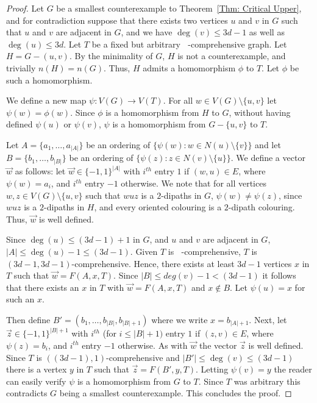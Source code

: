 \documentclass[11pt]{article}
\theoremstyle{definition}
\DeclareMathOperator{\coe}{6\Big(1+\frac{9d^2}{4}\Big)^{\frac{1}{2}}d}
\DeclareMathOperator{\bound}{\Big( 3d-1, \coe\sqrt{n}\Big)}
\begin{document}
\begin{proof}
    Let $G$ be a smallest counterexample to Theorem~\ref{Thm: Critical Upper},
    and for contradiction suppose that there exists two vertices $u$ and $v$ in $G$ such that
    $u$ and $v$ are adjacent in $G$, and we have $\deg(v)\leq 3d-1$ as well as $\deg(u)\leq 3d$.
    Let $T$ be a fixed but arbitrary $\bound$-comprehensive graph.
    Let $H = G - (u,v)$.
    By the minimality of $G$, $H$ is not a counterexample,
    and trivially $n(H) = n(G)$.
    Thus, $H$ admits a homomorphism $\phi$ to $T$.
    Let $\phi$ be such a homomorphism.

    We define a new map $\psi: V(G) \rightarrow V(T)$.
    For all $w \in V(G)\setminus \{u,v\}$ let $\psi(w)=\phi(w)$.
    Since $\phi$ is a homomorphism from $H$ to $G$, 
    without having defined $\psi(u)$ or $\psi(v)$,
    $\psi$ is a homomorphism from $G-\{u,v\}$ to $T$.

    Let $A = \{a_1,\dots, a_{|A|}\}$ be an ordering of $\{\psi(w): w \in N(u)\setminus \{v\}\}$ and let $B = \{b_1,\dots, b_{|B|}\}$ be an ordering of $\{\psi(z): z \in N(v)\setminus \{u\}\}$.
    We define a vector $\vec{w}$ as follows: let $\vec{w} \in \{-1,1\}^{|A|}$ with $i^{th}$ entry $1$ if $(w,u)\in E$, where $\psi(w) = a_i$, and $i^{th}$ entry $-1$ otherwise.
    We note that for all vertices $w,z \in V(G)\setminus \{u,v\}$ such that 
    $wuz$ is a $2$-dipaths in $G$, $\psi(w)\neq \psi(z)$,
    since $wuz$ is a $2$-dipaths in $H$, and every oriented colouring is a $2$-dipath colouring.
    Thus, $\vec{w}$ is well defined.

    Since $\deg(u)\leq (3d-1)+1$ in $G$, and $u$ and $v$ are adjacent in $G$, $|A|\leq \deg(u) - 1\leq (3d-1)$.
    Given $T$ is $\bound$-comprehensive, $T$ is $(3d-1,3d-1)$-comprehensive.
    Hence, there exists at least $3d-1$ vertices $x$ in $T$ such that $\vec{w} = F(A,x,T)$.
    Since $|B|\leq deg(v)-1 < (3d-1)$ it follows that there exists an $x$ in $T$ with $\vec{w} = F(A,x,T)$ and $x \notin B$.
    Let $\psi(u)=x$ for such an $x$.

    Then define $B' = (b_1,\dots, b_{|B|}, b_{|B|+1})$ where we write $x = b_{|A|+1}$.
    Next, let $\vec{z} \in \{-1,1\}^{|B|+1}$ with $i^{th}$ (for $i \leq |B|+1)$ entry $1$ if $(z,v)\in E$, where $\psi(z) = b_i$, and $i^{th}$ entry $-1$ otherwise.
    As with $\vec{w}$ the vector $\vec{z}$ is well defined.
    Since $T$ is $((3d-1),1)$-comprehensive and $|B'|\leq \deg(v)\leq (3d-1)$ there is a vertex $y$ in $T$ such that 
    $\vec{z} = F(B',y,T)$.
    Letting $\psi(v) = y$ the reader can easily verify $\psi$ is a homomorphism from $G$ to $T$.
    Since $T$ was arbitrary
    this contradicts $G$ being a smallest counterexample.
    This concludes the proof.
\end{proof}
\end{document}
